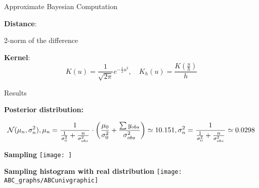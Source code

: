 \begin{section}{Approximate Bayesian Computation}
\begin{frame}
{\textbf{Distance}: 
\begin{center}
	2-norm of the difference
\end{center}   %

\textbf{Kernel}: 
$$
K(u) = 
\frac{1}{\sqrt{2\pi}} e^{-\frac{1}{2}u^2}, 
\quad K_h(u) 
= \frac{K(\frac u h)}{h}
$$
}
\end{frame}


\begin{frame}{Results}

	{\small
		\textbf{Posterior distribution:}
		
		$$
		\mathcal{N}(\mu_n, \sigma^2_n), 
		\vspace{0.3cm}
		\mu_n 
		= \frac{1}{ \frac{1}{\sigma_0^2} + \frac{n}{\sigma_{obs}^2} } 
		\cdot \left(\frac{\mu_0}{\sigma_0^2} + \frac{\sum y_{obs}}{\sigma_{obs}^2}\right)
		\simeq 10.151,
		\vspace{0.3cm}
		\sigma^2_n
		= \frac{1}{ \frac{1}{\sigma_0^2} + \frac{n}{\sigma_{obs}^2} } 
		\simeq 0.0298
		$$
	}



\begin{minipage}{0.45\textwidth}
\begin{center}
	{\scriptsize \textbf{Sampling}}
	\texttt{[image: ]}
\end{center}
\end{minipage}
\hfill
\begin{minipage}{0.45\textwidth}
\begin{center}
	{\scriptsize \textbf{Sampling histogram with real distribution}}
	\texttt{[image: ABC\_graphs/ABCunivgraphic]}
\end{center}
\end{minipage}



\end{frame}
\end{section}
